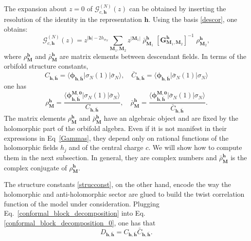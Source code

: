 \documentclass[a4paper,11pt]{article}
\begin{document}
The expansion about $z=0$ of $\mathcal{G}_{c, \boldsymbol{h}}^{(N)}(z)$ can be obtained by inserting the resolution of the identity in the representation $\boldsymbol{h}$. Using the basis \eqref{descor}, one obtains:
\begin{equation}\label{conformal_block_decomposition}
 \mathcal{G}_{c,\boldsymbol{h}}^{(N)}(z)=
 z^{|\boldsymbol{h}|-2h_{\sigma_N}}\sum_{\boldsymbol{M}_1, \boldsymbol{M}_2} z^{|\boldsymbol{M}_1|}\;\bar{\rho}^{\boldsymbol{h}}_{\boldsymbol{M}_1}\; [\boldsymbol{G}^{\boldsymbol{h}}_{\boldsymbol{M}_1,\boldsymbol{M}_2}]^{-1}\;\rho^{\boldsymbol{h}}_{\boldsymbol{M}_2},
\end{equation}
where $\rho_{\boldsymbol{M}}^{\boldsymbol{h}}$ and $\bar{\rho}^{\boldsymbol{h}}_{\boldsymbol{M}}$ are matrix elements between descendant fields. In terms of the orbifold structure constants,
\begin{equation}
\label{strucconst}
C_{\boldsymbol{h},\boldsymbol{\bar{h}}}=\langle \boldsymbol{\phi}_{\boldsymbol{h},\boldsymbol{\bar{h}}}| \sigma_{N}(1)|\bar{\sigma}_N\rangle, \quad 
\bar{C}_{\boldsymbol{h}, \boldsymbol{\bar{h}}}=\langle \boldsymbol{\phi}_{\boldsymbol{h}, \boldsymbol{\bar{h}}}|\bar{\sigma}_N(1)|\sigma_N\rangle
\end{equation}
one has
 \begin{equation}
 \label{Gammas}
\rho^{\boldsymbol{h}}_{\boldsymbol{M}} = \frac{\langle \boldsymbol{\phi}^{\boldsymbol{M},\boldsymbol{0}}_{\boldsymbol{h},\boldsymbol{\bar{h}}}| \sigma_{N}(1)|\bar{\sigma}_{N}\rangle}{C_{\boldsymbol{h},\boldsymbol{\bar{h}}}},\quad  
\bar{\rho}^{\boldsymbol{h}}_{\boldsymbol{M}} = \frac{\langle\boldsymbol{\phi}_{\boldsymbol{h}, \boldsymbol{\bar{h}}}^{\boldsymbol{M}, \boldsymbol{0}}|\bar{\sigma}_{N}(1)|\sigma_N\rangle}{\bar{C}_{\boldsymbol{h},\boldsymbol{\bar{h}}}} .
 \end{equation}
 The matrix elements  $\rho^{\boldsymbol{h}}_{\boldsymbol{M}}$ and $\bar{\rho}^{\boldsymbol{h}}_{\boldsymbol{M}}$ have an algebraic object and  are fixed by the holomorphic part of the orbifold algebra. Even if it is not manifest in their expressions in Eq~\eqref{Gammas}, they depend only on rational functions of the holomorphic fields $h_j$ and of the central charge $c$. We will show how to compute them in the next subsection. In general, they are complex 
 numbers and $\bar{\rho}_{\boldsymbol{M}}^{\boldsymbol{h}}$ is the complex conjugate of $\rho_{\boldsymbol{M}}^{\boldsymbol{h}}$.
 
\noindent  The structure constants \eqref{strucconst}, on the other hand, encode the way the holomorphic and anti-holomorphic sector are glued to build the twist correlation function of the model under consideration. Plugging Eq.~\eqref{conformal_block_decomposition} into Eq.\eqref{conformal_block_decomposition_0}, one has  that 
 \begin{equation}\label{DC}
 D_{\boldsymbol{h},\boldsymbol{\bar{h}}}= C_{\boldsymbol{h},\boldsymbol{\bar{h}}}\bar{C}_{\boldsymbol{h}, \boldsymbol{\bar{h}}}.
 \end{equation}
\end{document}
